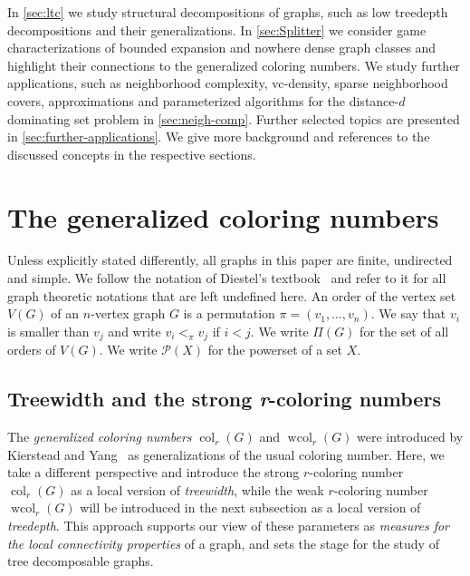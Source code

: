 \documentclass[1p,number,a4paper]{elsarticle}
\theoremstyle{remark}
\DeclareMathOperator{\col}{col}
\DeclareMathOperator{\wcol}{wcol}
\begin{document}
In \cref{sec:ltc} we study structural decompositions of graphs, 
such as low treedepth decompositions and their generalizations. 
In \cref{sec:Splitter} we consider game characterizations of bounded expansion and nowhere dense graph classes and highlight their connections to the generalized coloring numbers. 
We study further applications, such as neighborhood complexity,  
vc-density, sparse neighborhood covers, 
approximations and parameterized algorithms for the distance-$d$ dominating set problem in \cref{sec:neigh-comp}. Further selected topics are presented in \cref{sec:further-applications}. 
We give more background and references 
to the discussed concepts in the respective sections.


\section{The generalized coloring numbers}\label{sec:generalized-col}

Unless explicitly stated differently, all graphs in this paper
are finite, undirected and simple. We follow the notation of 
Diestel's textbook~\cite{diestel2018graph} and refer to it for all graph theoretic
notations that are left undefined here. 
An order of the vertex set $V(G)$ of an $n$-vertex graph $G$ is a permutation 
$\pi=(v_1,\ldots, v_n)$. We say that $v_i$ is smaller than $v_j$
and write $v_i<_\pi v_j$ if $i<j$. We write $\Pi(G)$ for the 
set of all orders of $V(G)$. 
We write $\mathcal{P}(X)$ for the powerset of a set $X$. 

\subsection{Treewidth and the strong \textit{r}-coloring numbers}

The \emph{generalized coloring numbers} $\col_r(G)$ and $\wcol_r(G)$
were introduced by Kierstead and Yang~\cite{kierstead2003orderings}
as generalizations of the usual coloring number. Here, we take
a different perspective and introduce the strong $r$-coloring number
$\col_r(G)$ as a local version of \emph{treewidth}, while the 
weak $r$-coloring number $\wcol_r(G)$ will be introduced in the 
next subsection as a local version of \emph{treedepth}. This approach 
supports our view of these parameters as \emph{measures for the local 
connectivity properties} of a graph, and sets the stage for the study of tree decomposable graphs. 
\end{document}
